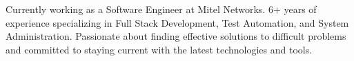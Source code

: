 

\begin{cvparagraph}

Currently working as a Software Engineer at Mitel Networks. 6+ years of experience specializing in Full Stack Development, Test Automation, and System Administration. Passionate about finding effective solutions to difficult problems and committed to staying current with the latest technologies and tools.
\end{cvparagraph}
